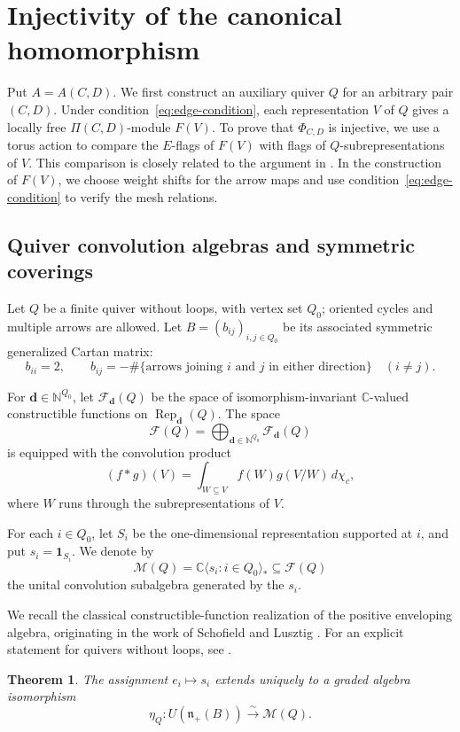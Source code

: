 \documentclass[12pt,reqno]{amsart}
\numberwithin{equation}{section}
\newtheorem{theorem}{Theorem}[section]
\theoremstyle{definition}
\theoremstyle{remark}
\newcommand{\nplus}{\mathfrak n_+}
\newcommand{\Rep}{\operatorname{Rep}}
\theoremstyle{plain}
\theoremstyle{plain}
\begin{document}
\section{Injectivity of the canonical homomorphism} \label{sec:injectivity}

Put $A=A(C,D)$. We first construct an auxiliary quiver $Q$ for an arbitrary pair $(C,D)$. Under condition~\eqref{eq:edge-condition}, 
each representation $V$ of $Q$ gives a locally free $\Pi(C,D)$-module $F(V)$. To prove that $\Phi_{C,D}$ is injective, we use a torus action to compare the $E$-flags of $F(V)$ with flags of $Q$-subrepresentations of $V$. This comparison is closely related to the argument in \cite[Appendix~A.2]{Fei26}. In the construction of $F(V)$, we choose weight shifts for the arrow maps and use condition~\eqref{eq:edge-condition} to verify the mesh relations.

\subsection{Quiver convolution algebras and symmetric coverings}
Let $Q$ be a finite quiver without loops, with vertex set $Q_0$; oriented cycles and multiple arrows are allowed. Let $B=(b_{ij})_{i,j\in Q_0}$ be its associated symmetric generalized Cartan matrix:
\[
  b_{ii}=2,\qquad b_{ij} = -\#\{\text{arrows joining $i$ and $j$ in either direction}\} \quad(i\ne j).
\]

For $\mathbf d\in\mathbb N^{Q_0}$, let $\mathcal F_{\mathbf d}(Q)$ be the space of
isomorphism-invariant $\mathbb C$-valued constructible functions on $\Rep_{\mathbf d}(Q)$. The space
\[
  \mathcal F(Q) = \bigoplus_{\mathbf d\in\mathbb N^{Q_0}} \mathcal F_{\mathbf d}(Q)
\]
  is equipped with the convolution product
\[
  (f*g)(V) = \int_{W\subseteq V} f(W)g(V/W)\,d\chi_c,
\]
where $W$ runs through the subrepresentations of $V$.

For each $i\in Q_0$, let $S_i$ be the one-dimensional representation supported at $i$, and put $s_i=\mathbf1_{S_i}$. We denote by
\[
  \mathcal M(Q) = \mathbb C\langle s_i:i\in Q_0\rangle_* \subseteq\mathcal F(Q)
\]
the unital convolution subalgebra generated by the $s_i$.

We recall the classical constructible-function realization of the positive enveloping algebra, originating in the work of Schofield and Lusztig \cite{Sch91,Lus91}. For an explicit statement for quivers without loops, see \cite[Theorem~3.1]{JS12}.

\begin{theorem}\label{thm:inj-hall}
The assignment $e_i\mapsto s_i$ extends uniquely
to a graded algebra isomorphism
\[
\eta_Q\colon U(\nplus(B))
\xrightarrow{\sim}\mathcal M(Q).
\]
\end{theorem}
\end{document}
